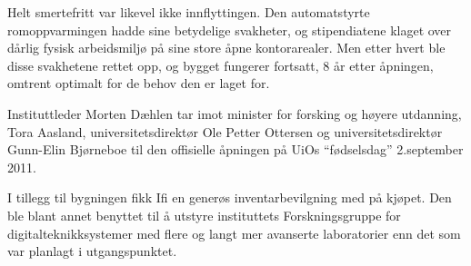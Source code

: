 \documentclass[../../main.tex]{subfiles}
\begin{document}
Helt smertefritt var likevel ikke innflyttingen. Den automatstyrte romoppvarmingen hadde sine betydelige svakheter, og stipendiatene klaget over dårlig fysisk arbeidsmiljø på sine store åpne kontorarealer. Men etter hvert ble disse svakhetene rettet opp, og bygget fungerer fortsatt, 8 år etter åpningen, omtrent optimalt for de behov den er laget for.


Instituttleder Morten Dæhlen tar imot minister for forsking og høyere utdanning, Tora Aasland, universitetsdirektør Ole Petter Ottersen og universitetsdirektør Gunn-Elin Bjørneboe til den offisielle åpningen på UiOs ``fødselsdag'' 2.september 2011.

I tillegg til bygningen fikk Ifi en generøs inventarbevilgning med på kjøpet. Den ble blant annet benyttet til å utstyre instituttets Forskningsgruppe for digitalteknikksystemer med flere og langt mer avanserte laboratorier enn det som var planlagt i utgangspunktet.
\end{document}
